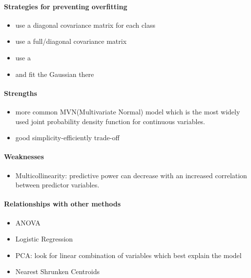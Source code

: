 \paragraph{Strategies for preventing overfitting}
\begin{itemize}
    \item use a diagonal covariance matrix for each class
    \item use a full/diagonal covariance matrix 
    \item use a 
    \item {} and fit the Gaussian there
\end{itemize}




\paragraph{Strengths}
\begin{itemize}
    \item more common MVN(Multivariate Normal) model which is the most widely used joint probability
        density function for continuous variables.
    \item good simplicity-efficiently trade-off 
\end{itemize}

\paragraph{Weaknesses}
\begin{itemize}
    \item Multicollinearity: predictive power can decrease with an 
        increased correlation between predictor variables.
\end{itemize}

\paragraph{Relationships with other methods}
\begin{itemize}
    \item ANOVA
    \item Logistic Regression
    \item PCA: look for linear combination of variables which best explain the model
    \item Nearest Shrunken Centroids
\end{itemize}

